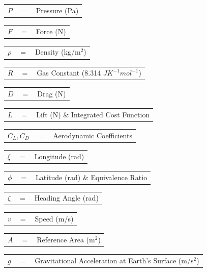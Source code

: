 \begin{tabular}{p{0.8cm}p{0.8cm}p{5.6cm}}
	$P$ & $=$ & Pressure (Pa)  \\
\end{tabular}
\begin{tabular}{p{0.8cm}p{0.8cm}p{5.6cm}}
	$F$ & $=$ & Force (N)\\
\end{tabular} 
\begin{tabular}{p{0.8cm}p{0.8cm}p{5.6cm}}
	$\rho$ & $=$ & Density (kg/m$^2$)\\
\end{tabular} 
\begin{tabular}{p{0.8cm}p{0.8cm}p{5.6cm}}
	$R$ & $=$ & Gas Constant (8.314 $J K^{-1} mol^{-1}$)\\
\end{tabular} 
\begin{tabular}{p{0.8cm}p{0.8cm}p{5.6cm}}
	$D$ & $=$ & Drag (N)\\
\end{tabular} 
\begin{tabular}{p{0.8cm}p{0.8cm}p{5.6cm}}
	$L$ & $=$ & Lift (N) \& Integrated Cost Function\\
\end{tabular} 
\begin{tabular}{p{0.8cm}p{0.8cm}p{5.6cm}}
	$C_L,C_D$ & $=$ & Aerodynamic Coefficients\\
\end{tabular} 
\begin{tabular}{p{0.8cm}p{0.8cm}p{5.6cm}}
	$\xi$ & $=$ & Longitude (rad)\\
\end{tabular} 
\begin{tabular}{p{0.8cm}p{0.8cm}p{5.6cm}}
	$\phi$ & $=$ & Latitude (rad) \& Equivalence Ratio\\
\end{tabular} 
\begin{tabular}{p{0.8cm}p{0.8cm}p{5.6cm}}
	$\zeta$ & $=$ & Heading Angle (rad)\\
\end{tabular} 
\begin{tabular}{p{0.8cm}p{0.8cm}p{5.6cm}}
	$v$ & $=$ & Speed (m/s)\\
\end{tabular} 
\begin{tabular}{p{0.8cm}p{0.8cm}p{5.6cm}}
	$A$ & $=$ & Reference Area (m$^2$)\\
\end{tabular} 
\begin{tabular}{p{0.8cm}p{0.8cm}p{5.6cm}}
	$g$ & $=$ & Gravitational Acceleration at Earth's Surface (m/s$^2$)\\
\end{tabular} 
